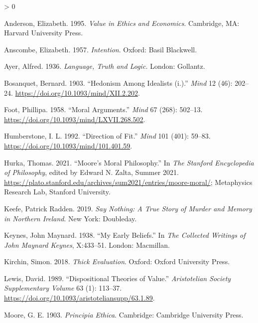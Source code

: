 \documentclass[
]{article}
\newlength{\cslhangindent}
\newenvironment{CSLReferences}[2] %
 {%
  \setlength{\parindent}{0pt}
  \ifodd #1 \everypar{\setlength{\hangindent}{\cslhangindent}}\ignorespaces\fi
  \ifnum #2 > 0
  \setlength{\parskip}{#2\baselineskip}
  \fi
 }%
 {}
\begin{document}
\hypertarget{refs}{}
\begin{CSLReferences}{1}{0}
\leavevmode\hypertarget{ref-Anderson1995}{}%
Anderson, Elizabeth. 1995. \emph{Value in Ethics and Economics}.
Cambridge, MA: Harvard University Press.

\leavevmode\hypertarget{ref-Anscombe1957}{}%
Anscombe, Elizabeth. 1957. \emph{Intention}. Oxford: Basil Blackwell.

\leavevmode\hypertarget{ref-Ayer1936}{}%
Ayer, Alfred. 1936. \emph{Language, Truth and Logic.} London: Gollantz.

\leavevmode\hypertarget{ref-Bosanquet1903}{}%
Bosanquet, Bernard. 1903. {``Hedonism Among Idealists (i.).''}
\emph{Mind} 12 (46): 202--24.
\url{https://doi.org/10.1093/mind/XII.2.202}.

\leavevmode\hypertarget{ref-Foot1958}{}%
Foot, Phillipa. 1958. {``Moral Arguments.''} \emph{Mind} 67 (268):
502--13. \url{https://doi.org/10.1093/mind/LXVII.268.502}.

\leavevmode\hypertarget{ref-Humberstone1992}{}%
Humberstone, I. L. 1992. {``Direction of Fit.''} \emph{Mind} 101 (401):
59--83. \url{https://doi.org/10.1093/mind/101.401.59}.

\leavevmode\hypertarget{ref-Hurka2021}{}%
Hurka, Thomas. 2021. {``{Moore's Moral Philosophy}.''} In \emph{The
{Stanford} Encyclopedia of Philosophy}, edited by Edward N. Zalta,
{S}ummer 2021.
\url{https://plato.stanford.edu/archives/sum2021/entries/moore-moral/};
Metaphysics Research Lab, Stanford University.

\leavevmode\hypertarget{ref-Keefe2018}{}%
Keefe, Patrick Radden. 2019. \emph{Say Nothing: A True Story of Murder
and Memory in Northern Ireland}. New York: Doubleday.

\leavevmode\hypertarget{ref-KeynesMEB}{}%
Keynes, John Maynard. 1938. {``My Early Beliefs.''} In \emph{The
Collected Writings of John Maynard Keynes}, X:433--51. London:
Macmillan.

\leavevmode\hypertarget{ref-Kirchin2017}{}%
Kirchin, Simon. 2018. \emph{Thick Evaluation}. Oxford: Oxford University
Press.

\leavevmode\hypertarget{ref-Lewis1989b}{}%
Lewis, David. 1989. {``Dispositional Theories of Value.''}
\emph{Aristotelian Society Supplementary Volume} 63 (1): 113--37.
\url{https://doi.org/10.1093/aristoteliansupp/63.1.89}.

\leavevmode\hypertarget{ref-Moore1903}{}%
Moore, G. E. 1903. \emph{Principia Ethica}. Cambridge: Cambridge
University Press.


\end{CSLReferences}
\end{document}

